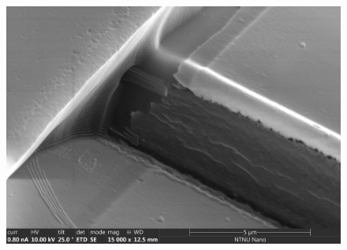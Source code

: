 \begin{figure}[h!]
\centering
  \centering
  \includegraphics[width=\textwidth]{fig/mr-DWL/mb_25_step_close1.jpg}
  \label{fig:sfig1}
\caption{}
\label{mrdwl_step}
\end{figure}



\FloatBarrier




\cleardoublepage
